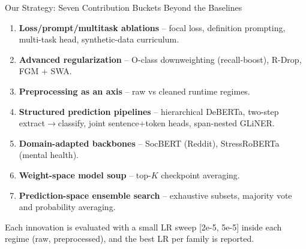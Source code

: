 \documentclass[aspectratio=169,10pt]{beamer}
\begin{document}
\begin{frame}{Our Strategy: Seven Contribution Buckets Beyond the Baselines}
  \footnotesize
  \begin{enumerate}\setlength{\itemsep}{0pt}
    \item \textbf{Loss/prompt/multitask ablations} -- focal loss, definition prompting, multi-task head, synthetic-data curriculum.
    \item \textbf{Advanced regularization} -- O-class downweighting (recall-boost), R-Drop, FGM $+$ SWA.
    \item \textbf{Preprocessing as an axis} -- raw vs cleaned runtime regimes.
    \item \textbf{Structured prediction pipelines} -- hierarchical DeBERTa, two-step extract$\to$classify, joint sentence$+$token heads, span-nested GLiNER.
    \item \textbf{Domain-adapted backbones} -- SocBERT (Reddit), StressRoBERTa (mental health).
    \item \textbf{Weight-space model soup} -- top-$K$ checkpoint averaging.
    \item \textbf{Prediction-space ensemble search} -- exhaustive subsets, majority vote and probability averaging.
  \end{enumerate}
  \vfill
  \textcolor{neutral}{\footnotesize Each innovation is evaluated with a small LR sweep [2e-5, 5e-5] inside each regime (raw, preprocessed), and the best LR per family is reported.}
\end{frame}
\end{document}
